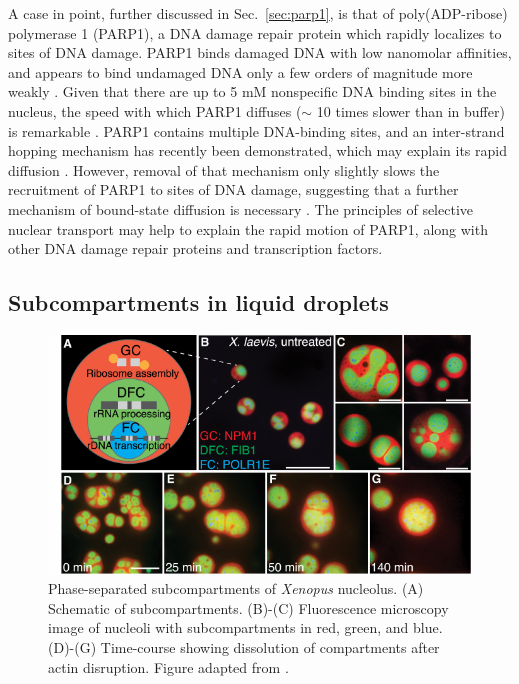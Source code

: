 A case in point, further discussed in Sec.~\ref{sec:parp1}, is that of poly(ADP-ribose) polymerase 1 (PARP1), a DNA damage repair protein which rapidly localizes to sites of DNA damage.  PARP1 binds damaged DNA with low nanomolar affinities, and appears to bind undamaged DNA only a few orders of magnitude more weakly \cite{sukhanova16}.  Given that there are up to 5 mM nonspecific DNA binding sites in the nucleus, the speed with which PARP1 diffuses ($\sim$ 10 times slower than in buffer) is remarkable \cite{iwahara13}.  PARP1 contains multiple DNA-binding sites, and an inter-strand hopping mechanism has recently been demonstrated, which may explain its rapid diffusion \cite{rudolph18}.  However, removal of that mechanism only slightly slows the recruitment of PARP1 to sites of DNA damage, suggesting that a further mechanism of bound-state diffusion is necessary \cite{mahadevan18}.  The principles of selective nuclear transport may help to explain the rapid motion of PARP1, along with other DNA damage repair proteins and transcription factors.


\subsection{Subcompartments in liquid droplets}

\begin{figure}
\centering
\includegraphics[width=0.8\linewidth]{figs/ch01/feric16.pdf}
\caption[Phase-separated subcompartments of the nucleolus.]{ Phase-separated subcompartments of \textit{Xenopus} nucleolus. (A) Schematic of subcompartments. (B)-(C) Fluorescence microscopy image of nucleoli with subcompartments in red, green, and blue. (D)-(G) Time-course showing dissolution of compartments after actin disruption. Figure adapted from \cite{feric16}.}
\label{fig:nucleolus}
\end{figure}

